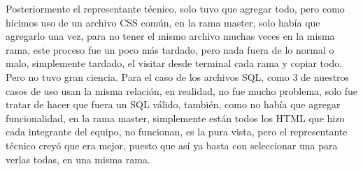 \documentclass[11pt,letterpaper]{article}
\begin{document}
Posteriormente el representante técnico, solo tuvo que agregar todo, pero como hicimos uso de un archivo CSS común, en la rama master, solo había que agregarlo una vez, para no tener el mismo archivo muchas veces en la misma rama, este proceso fue un poco más tardado, pero nada fuera de lo normal o malo, simplemente tardado, el visitar desde terminal cada rama y copiar todo. Pero no tuvo gran ciencia. Para el caso de los archivos SQL, como 3 de nuestros casos de uso usan la misma relación, en realidad, no fue mucho problema, solo fue tratar de hacer que fuera un SQL válido, también, como no había que agregar funcionalidad, en la rama master, simplemente están todos los HTML que hizo cada integrante del equipo, no funcionan, es la pura vista, pero el representante técnico creyó que era mejor, puesto que así ya basta con seleccionar una para verlas todas, en una misma rama.\\
\end{document}

